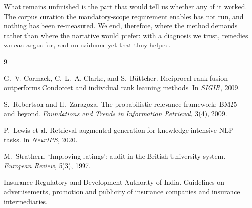 \documentclass[10pt]{article}
\begin{document}
What remains unfinished is the part that would tell us whether any of it worked.
The corpus curation the mandatory-scope requirement enables has not run, and
nothing has been re-measured. We end, therefore, where the method demands rather
than where the narrative would prefer: with a diagnosis we trust, remedies we
can argue for, and no evidence yet that they helped.

\begin{thebibliography}{9}
\footnotesize

G.~V. Cormack, C.~L.~A. Clarke, and S.~B\"uttcher.
\newblock Reciprocal rank fusion outperforms Condorcet and individual rank
  learning methods.
\newblock In \emph{SIGIR}, 2009.

S.~Robertson and H.~Zaragoza.
\newblock The probabilistic relevance framework: BM25 and beyond.
\newblock \emph{Foundations and Trends in Information Retrieval}, 3(4), 2009.

P.~Lewis et al.
\newblock Retrieval-augmented generation for knowledge-intensive NLP tasks.
\newblock In \emph{NeurIPS}, 2020.

M.~Strathern.
\newblock `Improving ratings': audit in the British University system.
\newblock \emph{European Review}, 5(3), 1997.

Insurance Regulatory and Development Authority of India.
\newblock Guidelines on advertisements, promotion and publicity of insurance
  companies and insurance intermediaries.

\end{thebibliography}
\end{document}
